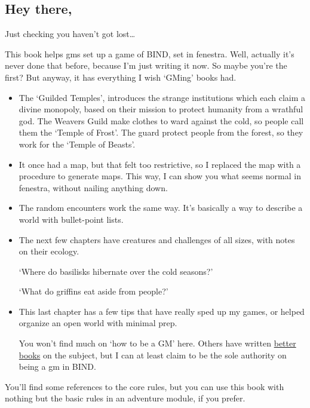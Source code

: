 \begin{multicols}{2}

\subsection{Hey there,}

Just checking you haven't got lost\ldots

This book helps \glspl{gm} set up a game of BIND, set in \gls{fenestra}.
Well, actually it's never done that before, because I'm just writing it now.
So maybe you're the first?
But anyway, it has everything I wish `GMing' books had.

\begin{itemize}
  \item
  The `Guilded Temples', introduces the strange institutions which each claim a divine monopoly, based on their mission to protect humanity from a wrathful god.
  The Weavers Guild make clothes to ward against the cold, so people call them the `Temple of Frost'.
  The \gls{guard} protect people from the forest, so they work for the `Temple of Beasts'.
  \item
  It once had a map, but that felt too restrictive, so I replaced the map with a procedure to generate maps.
  This way, I can show you what seems normal in \gls{fenestra}, without nailing anything down.
  \item
  The random encounters work the same way.
  It's basically a way to describe a world with bullet-point lists.
  \item
  The next few chapters have creatures and challenges of all sizes, with notes on their ecology.

  `Where do basilisks hibernate over the cold seasons?'

  `What do griffins eat aside from people?'
  \item
  This last chapter has a few tips that have really sped up my games, or helped organize an open world with minimal prep.

  You won't find much on `how to be a GM' here.
  Others have written \href{https://thealexandrian.net/so-you-want-to-be-a-game-master}{better books} on the subject, but I can at least claim to be the sole authority on being a \gls{gm} in BIND.

\end{itemize}

You'll find some references to the core rules, but you can use this book with nothing but the basic rules in an adventure module, if you prefer.


\end{multicols}
